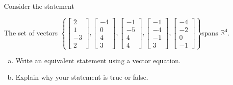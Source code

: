 
\begin{exerciseStatement}


Consider the statement 
\begin{center}\begin{minipage}{0.8\textwidth}
 The set of vectors \( \left\{ \left[\begin{array}{c}
2 \\
1 \\
-3 \\
2
\end{array}\right] , \left[\begin{array}{c}
-4 \\
0 \\
4 \\
3
\end{array}\right] , \left[\begin{array}{c}
-1 \\
-5 \\
4 \\
4
\end{array}\right] , \left[\begin{array}{c}
-1 \\
-4 \\
-1 \\
3
\end{array}\right] , \left[\begin{array}{c}
-4 \\
-2 \\
0 \\
-1
\end{array}\right] \right\} \)spans \(\mathbb{R}^4\). 
\end{minipage}\end{center}
    


\begin{enumerate}[(a)]
\item  Write an equivalent statement using a vector equation.
\item  Explain why your statement is true or false.
\end{enumerate}
    
\end{exerciseStatement}
    
